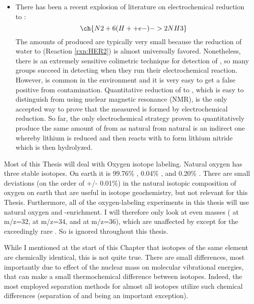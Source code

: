 \begin{itemize}
	\item 
	There has been a recent explosion of literature on electrochemical  reduction to :
	\begin{equation}
	\ch{N2 + 6 (H+ + e- ) -> 2 NH3} 
	\end{equation}
	The amounts of  produced are typically very small because the reduction of water to  (Reaction \ref{rxn:HER2}) is almost universally favored. Nonetheless, there is an extremely sensitive colimetric technique for detection of , so many groups succeed in detecting  when they run their electrochemical reaction. However,  is common in the environment and it is very easy to get a false positive from  contamination. Quantitative reduction of  to , which is easy to distinguish from  using nuclear magnetic resonance (NMR), is the only accepted way to prove that the measured  is formed by electrochemical  reduction\cite{Andersen2019}. So far, the only electrochemical strategy proven to quantitatively produce the same amount of  from  as natural  from natural  is an indirect one whereby lithium is reduced and then reacts with  to form lithium nitride which is then hydrolyzed\cite{Tsuneto1994, Andersen2019}.
\end{itemize}

Most of this Thesis will deal with Oxygen isotope labeling. Natural oxygen has three stable isotopes. On earth it is 99.76\% , 0.04\% , and 0.20\% \cite{Harnung2012}. There are small deviations (on the order of +/- 0.01\%) in the natural isotopic composition of oxygen on earth that are useful in isotope geochemistry, but not relevant for this Thesis. Furthermore, all of the oxygen-labeling experiments in this thesis will use natural oxygen and -enrichment. I will therefore only look at even masses ( at m/z=32,  at m/z=34, and  at m/z=36), which are unaffected by  except for the exceedingly rare . So  is ignored throughout this thesis.

While I mentioned at the start of this Chapter that isotopes of the same element are chemically identical, this is not quite true. There are small differences, most importantly due to effect of the nuclear mass on molecular vibrational energies, that can make a small thermochemical difference between isotopes. Indeed, the most employed separation methods for almost all isotopes utilize such chemical differences (separation of  and  being an important exception)\cite{IsotopeSeparation}. 

